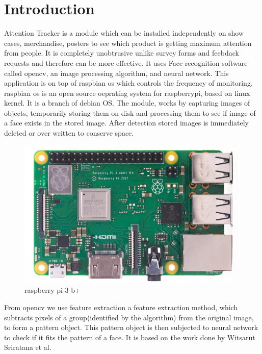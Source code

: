 \section{Introduction}
Attention Tracker is a module which can be installed independently on show cases, merchandise, posters to see which product is getting maximum attention from people. It is completely unobtrusive unlike survey forms and feebdack requests and therefore can be more effective. It uses Face recognition software called opencv, an image processing algorithm, and neural network. This application is on top of
raspbian os which controls the frequency of monitoring, raspbian os is an open source oeprating system for raspberrypi, based on linux kernel. It is a branch of debian OS. The module, works by capturing images of objects, temporarily storing them on disk and processing them to see if image of a face exists in the stored image. After detection stored images is immediately deleted or over written to conserve space. 

\begin{figure}[!ht]
\centering
\includegraphics[scale=0.7]{raspberrypi}
\caption{raspberry pi 3 b+}
\end{figure}


From opencv we use feature extraction a feature extraction method, which subtracts pixels of a group(identified by the algorithm) from
the original image, to form a pattern object. This pattern object is then subjected to neural network to check if it fits the pattern of a face. It is based on the work done by Witsarut Sriratana et al\cite{opencv}.
